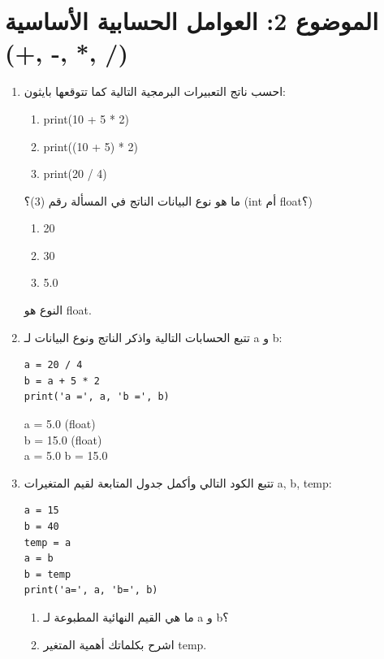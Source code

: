 \documentclass[14pt]{extarticle}
\begin{document}
\section*{الموضوع 2: العوامل الحسابية الأساسية (+, -, *, /)}
\begin{enumerate}[itemsep=3em]

\item
احسب ناتج التعبيرات البرمجية التالية كما تتوقعها بايثون:
\begin{enumerate}[label=\arabic*)]
    \item \textenglish{print(10 + 5 * 2)}
    \item \textenglish{print((10 + 5) * 2)}
    \item \textenglish{print(20 / 4)}
\end{enumerate}
ما هو نوع البيانات الناتج في المسألة رقم (3)؟ (\textenglish{int} أم \textenglish{float}؟)

\ifwithsols
\begin{boxSolution}
\begin{enumerate}[label=\arabic*)]
    \item \textenglish{20}
    \item \textenglish{30}
    \item \textenglish{5.0}
\end{enumerate}
النوع هو \textenglish{float}.
\end{boxSolution}
\fi

\item
تتبع الحسابات التالية واذكر الناتج ونوع البيانات لـ \textenglish{a} و \textenglish{b}:
\begin{boxCode}
\begin{english}
\begin{verbatim}
a = 20 / 4
b = a + 5 * 2
print('a =', a, 'b =', b)
\end{verbatim}
\end{english}
\end{boxCode}

\ifwithsols
\begin{boxSolution}
\begin{english}
a = 5.0 (float) \\
b = 15.0 (float) \\
a = 5.0 b = 15.0
\end{english}
\end{boxSolution}
\fi

\item
تتبع الكود التالي وأكمل جدول المتابعة لقيم المتغيرات \textenglish{a, b, temp}:
\begin{boxCode}
\begin{english}
\begin{verbatim}
a = 15
b = 40
temp = a
a = b
b = temp
print('a=', a, 'b=', b)
\end{verbatim}
\end{english}
\end{boxCode}
\begin{enumerate}
    \item ما هي القيم النهائية المطبوعة لـ \textenglish{a} و \textenglish{b}؟
    \item اشرح بكلماتك أهمية المتغير \textenglish{temp}.
\end{enumerate}


\end{enumerate}
\end{document}
